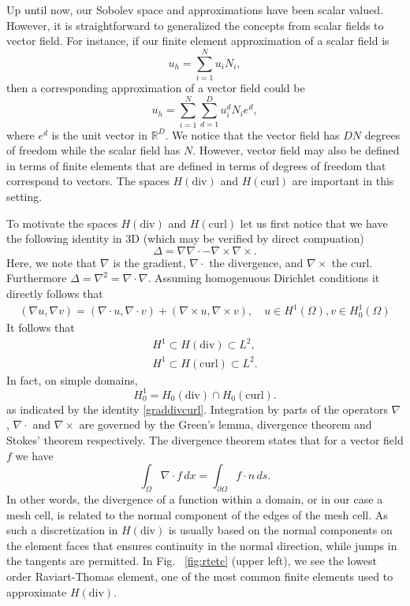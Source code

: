 Up until now, our Sobolev space and approximations have been scalar valued. However, it is straightforward to generalized the concepts from scalar fields to vector field. 
For instance, if our finite element approximation of a scalar field is 
\[
u_h = \sum_{i=1}^N u_i N_i,  
\]
then a corresponding approximation of a vector field could be 
\[
u_h = \sum_{i=1}^N \sum_{d=1}^D  u^d_i N_i e^d,  
\]
where $e^d$ is the unit vector in $\mathbb{R}^D$. We notice that the vector field has $D N$ degrees of freedom while the scalar field has $N$.  
However, vector field may also be defined in terms of finite elements that are defined in terms of degrees of freedom that
correspond to vectors.  The spaces $H(\mbox{div})$ and $H(\mbox{curl})$ are important in this setting.  

To motivate the spaces $H(\mbox{div})$ and $H(\mbox{curl})$ let us first notice that we have the
following identity  in 3D (which may be verified by direct compuation)
\[
\Delta = \nabla \nabla \cdot - \nabla\times \nabla \times.   
\]
Here, we note that $\nabla$ is the gradient, $\nabla\cdot$ the divergence, and $\nabla\times$ the curl.  
Furthermore $\Delta = \nabla^2 = \nabla\cdot\nabla$. Assuming homogenuous Dirichlet conditions
it directly follows that 
\begin{align}
(\nabla u, \nabla v) = (\nabla \cdot u, \nabla \cdot v)  + (\nabla\times u,  \nabla \times v), \quad u\in H^1(\Omega), v\in H_0^1(\Omega)     
\label{graddivcurl}
\end{align}
It follows that
\begin{align*}
H^1 \subset H(\mbox{div}) \subset L^2, \\   
H^1 \subset H(\mbox{curl}) \subset L^2 .    
\end{align*}
In fact, on simple domains, 
\[
H_0^1 = H_0(\mbox{div}) \cap H_0(\mbox{curl}) .  
\]
as indicated by the identity \eqref{graddivcurl}. 
Integration by parts of the operators $\nabla$, $\nabla\cdot$ and 
$\nabla \times$ are governed by the Green's lemma, divergence theorem
and Stokes' theorem respectively. The divergence theorem states 
that for a vector field $f$ we have 
\[
	\int_\Omega \nabla \cdot f\, dx = \int_{\partial \Omega} f \cdot n \, ds  .  
\]
In other words, the divergence of a function within a domain, or in our case a mesh cell, is
related to the normal component of the edges of the mesh cell. As such a discretization
in $H(\mbox{div})$ is usually based on the normal components on the element faces that ensures continuity in the normal direction, while jumps
in the tangents are permitted. 
In Fig. ~\ref{fig:rtetc} (upper left), we see the lowest order Raviart-Thomas element, one of the most common finite elements used to approximate $H(\mbox{div})$. 

